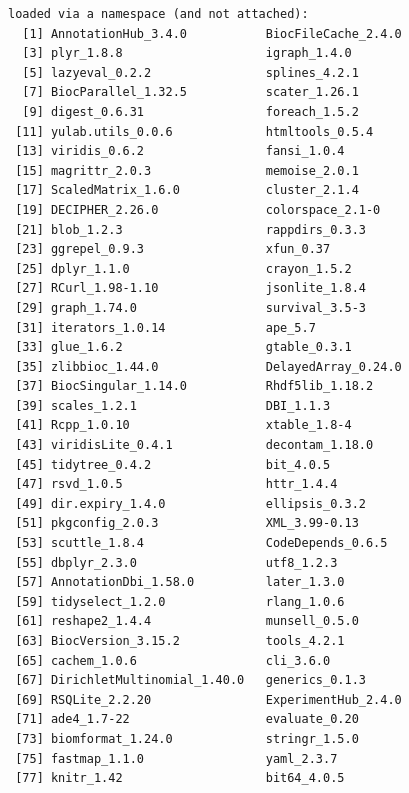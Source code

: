 \documentclass[
]{book}
\begin{document}
\begin{verbatim}
loaded via a namespace (and not attached):
  [1] AnnotationHub_3.4.0           BiocFileCache_2.4.0          
  [3] plyr_1.8.8                    igraph_1.4.0                 
  [5] lazyeval_0.2.2                splines_4.2.1                
  [7] BiocParallel_1.32.5           scater_1.26.1                
  [9] digest_0.6.31                 foreach_1.5.2                
 [11] yulab.utils_0.0.6             htmltools_0.5.4              
 [13] viridis_0.6.2                 fansi_1.0.4                  
 [15] magrittr_2.0.3                memoise_2.0.1                
 [17] ScaledMatrix_1.6.0            cluster_2.1.4                
 [19] DECIPHER_2.26.0               colorspace_2.1-0             
 [21] blob_1.2.3                    rappdirs_0.3.3               
 [23] ggrepel_0.9.3                 xfun_0.37                    
 [25] dplyr_1.1.0                   crayon_1.5.2                 
 [27] RCurl_1.98-1.10               jsonlite_1.8.4               
 [29] graph_1.74.0                  survival_3.5-3               
 [31] iterators_1.0.14              ape_5.7                      
 [33] glue_1.6.2                    gtable_0.3.1                 
 [35] zlibbioc_1.44.0               DelayedArray_0.24.0          
 [37] BiocSingular_1.14.0           Rhdf5lib_1.18.2              
 [39] scales_1.2.1                  DBI_1.1.3                    
 [41] Rcpp_1.0.10                   xtable_1.8-4                 
 [43] viridisLite_0.4.1             decontam_1.18.0              
 [45] tidytree_0.4.2                bit_4.0.5                    
 [47] rsvd_1.0.5                    httr_1.4.4                   
 [49] dir.expiry_1.4.0              ellipsis_0.3.2               
 [51] pkgconfig_2.0.3               XML_3.99-0.13                
 [53] scuttle_1.8.4                 CodeDepends_0.6.5            
 [55] dbplyr_2.3.0                  utf8_1.2.3                   
 [57] AnnotationDbi_1.58.0          later_1.3.0                  
 [59] tidyselect_1.2.0              rlang_1.0.6                  
 [61] reshape2_1.4.4                munsell_0.5.0                
 [63] BiocVersion_3.15.2            tools_4.2.1                  
 [65] cachem_1.0.6                  cli_3.6.0                    
 [67] DirichletMultinomial_1.40.0   generics_0.1.3               
 [69] RSQLite_2.2.20                ExperimentHub_2.4.0          
 [71] ade4_1.7-22                   evaluate_0.20                
 [73] biomformat_1.24.0             stringr_1.5.0                
 [75] fastmap_1.1.0                 yaml_2.3.7                   
 [77] knitr_1.42                    bit64_4.0.5                  

\end{verbatim}
\end{document}
